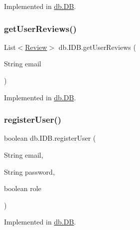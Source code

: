 Implemented in \hyperlink{classdb_1_1_d_b_a02a42ee97d8e7189733dfc720a05452e}{db.\+DB}.

\mbox{\label{interfacedb_1_1_i_d_b_afd7ee8924344c13a64a1363d1a295771}} 
\subsubsection{\texorpdfstring{get\+User\+Reviews()}{getUserReviews()}}
{\footnotesize\ttfamily List$<$\hyperlink{classserver_1_1data_1_1_review}{Review}$>$ db.\+I\+D\+B.\+get\+User\+Reviews (\begin{DoxyParamCaption}\item[{String}]{email }\end{DoxyParamCaption})}



Implemented in \hyperlink{classdb_1_1_d_b_a9ef4c302b91da17852f09a27a90fb4b5}{db.\+DB}.

\mbox{\label{interfacedb_1_1_i_d_b_a92913d9357ef22978adc35d3fb9d3590}} 
\subsubsection{\texorpdfstring{register\+User()}{registerUser()}}
{\footnotesize\ttfamily boolean db.\+I\+D\+B.\+register\+User (\begin{DoxyParamCaption}\item[{String}]{email,  }\item[{String}]{password,  }\item[{boolean}]{role }\end{DoxyParamCaption})}



Implemented in \hyperlink{classdb_1_1_d_b_a76fac3ed38eaecd5a073224d6ad51332}{db.\+DB}.

\mbox{\label{interfacedb_1_1_i_d_b_aed305f6c36ff140084636a8eded479db}} 
